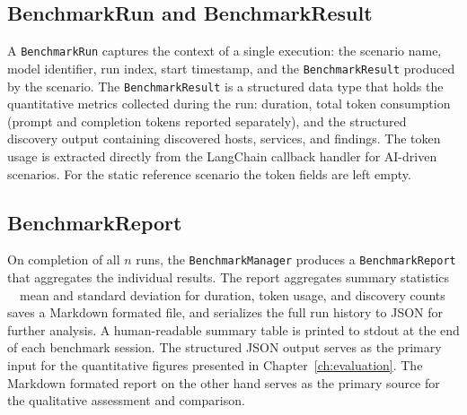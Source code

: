 \subsection{BenchmarkRun and BenchmarkResult}\label{subsec:benchmark-run-and-result}

A \texttt{BenchmarkRun} captures the context of a single execution:
the scenario name, model identifier, run index, start timestamp,
and the \texttt{BenchmarkResult} produced by the scenario.
The \texttt{BenchmarkResult} is a structured data type that holds the quantitative metrics collected during the run:
duration, total token consumption (prompt and completion tokens reported separately),
and the structured discovery output containing discovered hosts, services, and findings.
The token usage is extracted directly from the \gls{LangChain} callback handler for \gls{AI}-driven scenarios.
For the static reference scenario the token fields are left empty.

\subsection{BenchmarkReport}\label{subsec:benchmark-report}

On completion of all $n$ runs, the \texttt{BenchmarkManager} produces a \texttt{BenchmarkReport} that aggregates the individual results.
The report aggregates summary statistics
~\textthreequartersemdash~mean and standard deviation for duration, token usage, and discovery counts~\textthreequartersemdash~\\
saves a Markdown formated file, and serializes the full run history to \gls{JSON} for further analysis.
A human-readable summary table is printed to stdout at the end of each benchmark session.
The structured \gls{JSON} output serves as the primary input for the quantitative figures presented in Chapter~\ref{ch:evaluation}.
The Markdown formated report on the other hand serves as the primary source for the qualitative assessment and comparison.
